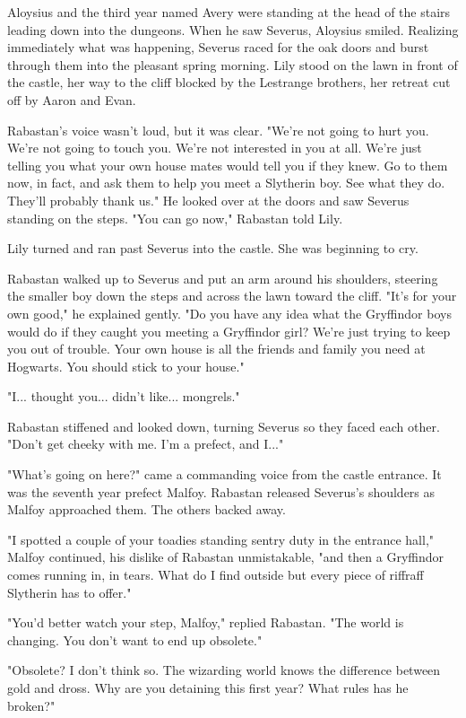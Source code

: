 \documentclass[a4paper,11pt]{article}
\begin{document}
Aloysius and the third year named Avery were standing at the head of the stairs leading down into the dungeons. When he saw Severus, Aloysius smiled. Realizing immediately what was happening, Severus raced for the oak doors and burst through them into the pleasant spring morning. Lily stood on the lawn in front of the castle, her way to the cliff blocked by the Lestrange brothers, her retreat cut off by Aaron and Evan.

Rabastan's voice wasn't loud, but it was clear. "We're not going to hurt you. We're not going to touch you. We're not interested in you at all. We're just telling you what your own house mates would tell you if they knew. Go to them now, in fact, and ask them to help you meet a Slytherin boy. See what they do. They'll probably thank us." He looked over at the doors and saw Severus standing on the steps. "You can go now," Rabastan told Lily.

Lily turned and ran past Severus into the castle. She was beginning to cry.

Rabastan walked up to Severus and put an arm around his shoulders, steering the smaller boy down the steps and across the lawn toward the cliff. "It's for your own good," he explained gently. "Do you have any idea what the Gryffindor boys would do if they caught you meeting a Gryffindor girl? We're just trying to keep you out of trouble. Your own house is all the friends and family you need at Hogwarts. You should stick to your house."

"I... thought you... didn't like... mongrels."

Rabastan stiffened and looked down, turning Severus so they faced each other. "Don't get cheeky with me. I'm a prefect, and I..."

"What's going on here?" came a commanding voice from the castle entrance. It was the seventh year prefect Malfoy. Rabastan released Severus's shoulders as Malfoy approached them. The others backed away.

"I spotted a couple of your toadies standing sentry duty in the entrance hall," Malfoy continued, his dislike of Rabastan unmistakable, "and then a Gryffindor comes running in, in tears. What do I find outside but every piece of riffraff Slytherin has to offer."

"You'd better watch your step, Malfoy," replied Rabastan. "The world is changing. You don't want to end up obsolete."

"Obsolete? I don't think so. The wizarding world knows the difference between gold and dross. Why are you detaining this first year? What rules has he broken?"
\end{document}
